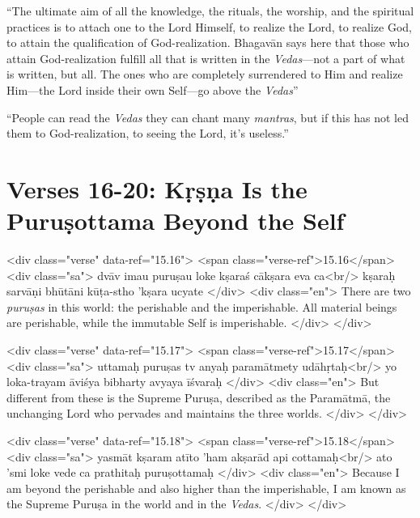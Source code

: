 \enquote{The ultimate aim of all the knowledge, the rituals, the worship, and the spiritual practices is to attach one to the Lord Himself, to realize the Lord, to realize God, to attain the qualification of God-realization. Bhagavān says here that those who attain God-realization fulfill all that is written in the \textit{Vedas}---not a part of what is written, but all. The ones who are completely surrendered to Him and realize Him---the Lord inside their own Self---go above the \textit{Vedas}}

\enquote{People can read the \textit{Vedas} they can chant many \textit{mantras}, but if this has not led them to God-realization, to seeing the Lord, it’s useless.}

\section{Verses 16-20: Kṛṣṇa Is the Puruṣottama Beyond the Self}\label{sec-verses-16-20-krsna-is-the-purusottama-beyond-the-self}



\begin{html}
<div class="verse" data-ref="15.16">
  <span class="verse-ref">15.16</span>
  <div class="sa">
    dvāv imau puruṣau loke kṣaraś cākṣara eva ca<br/>
    kṣaraḥ sarvāṇi bhūtāni kūṭa-stho ’kṣara ucyate
  </div>
  <div class="en">
    There are two \textit{puruṣas} in this world: the perishable and the imperishable. All material beings are perishable, while the immutable Self is imperishable.
  </div>
</div>
\end{html}



\begin{html}
<div class="verse" data-ref="15.17">
  <span class="verse-ref">15.17</span>
  <div class="sa">
    uttamaḥ puruṣas tv anyaḥ paramātmety udāhṛtaḥ<br/>
    yo loka-trayam āviśya bibharty avyaya īśvaraḥ
  </div>
  <div class="en">
    But different from these is the Supreme Puruṣa, described as the Paramātmā, the unchanging Lord who pervades and maintains the three worlds.
  </div>
</div>
\end{html}



\begin{html}
<div class="verse" data-ref="15.18">
  <span class="verse-ref">15.18</span>
  <div class="sa">
    yasmāt kṣaram atīto ’ham akṣarād api cottamaḥ<br/>
    ato ’smi loke vede ca prathitaḥ puruṣottamaḥ
  </div>
  <div class="en">
    Because I am beyond the perishable and also higher than the imperishable, I am known as the Supreme Puruṣa in the world and in the \textit{Vedas}.
  </div>
</div>
\end{html}



